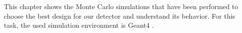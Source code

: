 This chapter shows the Monte Carlo simulations that have been performed to choose the best design for our detector and understand its behavior. For this task, the used simulation environment is Geant4 \cite{Geant4WP, Geant4P}.